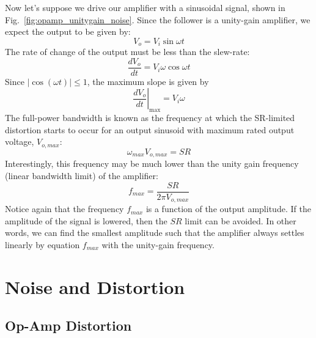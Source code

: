 Now let's suppose we drive our amplifier with a sinusoidal signal, shown in Fig.~\ref{fig:opamp_unitygain_noise}.   Since the follower is a  unity-gain amplifier, we expect the output to be given by:
%
\begin{equation} 
	V_o = V_i \sin\omega t 
\end{equation}
%
The rate of change of the output must be less than the slew-rate:
%
\begin{equation}
	\frac{dV_o}{dt} = V_i \omega \cos\omega t 
\end{equation}
%
Since $|\cos(\omega t)| \le 1$, the maximum slope is given by
%
\begin{equation}
	\left. \frac{dV_o}{dt} \right|_{\text{max}} = V_i \omega 
\end{equation}
%
The full-power bandwidth is known as the frequency at which the SR-limited distortion starts to occur for an output sinusoid with maximum rated output voltage, $V_{o,max}$:
\begin{equation}
	\omega_{max} V_{o,max} = SR
\end{equation} 
%
Interestingly, this frequency may be much lower than the unity gain frequency (linear bandwidth limit) of the amplifier:
%
\begin{equation} 
	f_{max} = \frac{SR}{2\pi V_{o,max}} 
\end{equation}
%
Notice again that the frequency $f_{max}$ is a function of the output amplitude.  If the amplitude of the signal is lowered, then the $SR$ limit can be avoided.  In other words, we can find the smallest amplitude such that the amplifier always settles linearly by equation $f_{max}$ with the unity-gain frequency.






\section{Noise and Distortion}


\subsection{Op-Amp Distortion}



